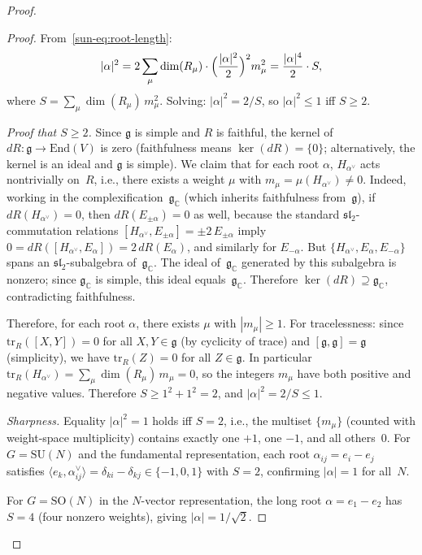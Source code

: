 \documentclass[11pt]{article}
\theoremstyle{definition}
\newcommand{\SU}{\mathrm{SU}}
\newcommand{\tr}{\mathrm{tr}}
\newcommand{\SO}{\mathrm{SO}}
\newcommand{\fg}{\mathfrak{g}}
\begin{document}
\begin{proof}
\begin{proof}
From~\eqref{sun-eq:root-length}:
\begin{equation}
|\alpha|^2=2\sum_\mu\dim(R_\mu)\cdot
\Bigl(\frac{|\alpha|^2}{2}\Bigr)^2 m_\mu^2
=\frac{|\alpha|^4}{2}\cdot S,
\end{equation}
where $S=\sum_\mu\dim(R_\mu)\,m_\mu^2$.
Solving: $|\alpha|^2=2/S$, so
$|\alpha|^2\le 1$ iff $S\ge 2$.

\emph{Proof that $S\ge 2$.}
Since $\fg$ is simple and $R$ is faithful,
the kernel of $dR:\fg\to\mathrm{End}(V)$ is zero
(faithfulness means $\ker(dR)=\{0\}$; alternatively,
the kernel is an ideal and $\fg$ is simple).
We claim that for each root $\alpha$, $H_{\alpha^\vee}$
acts nontrivially on~$R$, i.e., there exists a weight
$\mu$ with $m_\mu=\mu(H_{\alpha^\vee})\ne 0$.
Indeed, working in the complexification~$\fg_{\mathbb{C}}$
(which inherits faithfulness from~$\fg$),
if $dR(H_{\alpha^\vee})=0$, then
$dR(E_{\pm\alpha})=0$ as well, because the
standard $\mathfrak{sl}_2$-commutation relations
$[H_{\alpha^\vee},E_{\pm\alpha}]=\pm 2\,E_{\pm\alpha}$
imply
$0=dR([H_{\alpha^\vee},E_\alpha])
=2\,dR(E_\alpha)$, and similarly for $E_{-\alpha}$.
But $\{H_{\alpha^\vee},E_\alpha,E_{-\alpha}\}$ spans
an $\mathfrak{sl}_2$-subalgebra of~$\fg_{\mathbb{C}}$.  The ideal
of~$\fg_{\mathbb{C}}$ generated by this subalgebra is nonzero;
since $\fg_{\mathbb{C}}$ is simple, this ideal equals~$\fg_{\mathbb{C}}$.
Therefore $\ker(dR)\supseteq\fg_{\mathbb{C}}$, contradicting
faithfulness.

Therefore, for each root $\alpha$, there exists
$\mu$ with $|m_\mu|\ge 1$.  For tracelessness:
since $\tr_R([X,Y])=0$ for all $X,Y\in\fg$
(by cyclicity of trace) and $[\fg,\fg]=\fg$
(simplicity), we have $\tr_R(Z)=0$ for all
$Z\in\fg$.  In particular
$\tr_R(H_{\alpha^\vee})
=\sum_\mu\dim(R_\mu)\,m_\mu=0$,
so the integers $m_\mu$ have both positive and
negative values.
Therefore $S\ge 1^2+1^2=2$, and
$|\alpha|^2=2/S\le 1$.

\emph{Sharpness.}
Equality $|\alpha|^2=1$ holds iff $S=2$, i.e.,
the multiset $\{m_\mu\}$ (counted with weight-space
multiplicity) contains exactly one $+1$, one $-1$,
and all others~$0$.  For $G=\SU(N)$
and the fundamental representation, each root
$\alpha_{ij}=e_i-e_j$ satisfies
$\langle e_k,\alpha_{ij}^\vee\rangle
=\delta_{ki}-\delta_{kj}\in\{-1,0,1\}$
with $S=2$, confirming $|\alpha|=1$ for all~$N$.

For $G=\SO(N)$ in the $N$-vector representation,
the long root $\alpha=e_1-e_2$ has $S=4$
(four nonzero weights), giving $|\alpha|=1/\sqrt{2}$.


\end{proof}
\end{proof}
\end{document}
